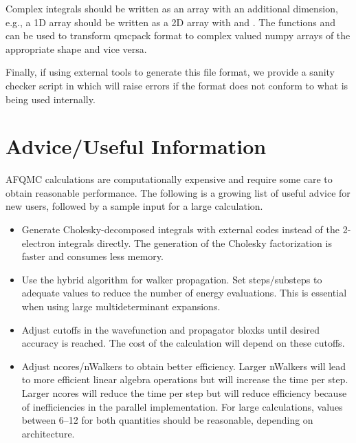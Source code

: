 Complex integrals should be written as an array with an additional dimension, e.g., a 1D array should be written as a 2D array with  and . The functions  and  can be used to transform qmcpack format to complex valued numpy arrays of the appropriate shape and vice versa.

Finally, if using external tools to generate this file format, we provide a sanity checker script in  which will raise errors if the format does not conform to what is being used internally.

\section{Advice/Useful Information}

AFQMC calculations are computationally expensive and require some care to obtain reasonable performance.
The following is a growing list of useful advice for new users, followed by a sample input for a large calculation.
\begin{itemize}
\item Generate Cholesky-decomposed integrals with external codes instead of the 2-electron integrals directly. The generation of the Cholesky factorization is faster and consumes less memory. 
\item Use the hybrid algorithm for walker propagation. Set steps/substeps to adequate values to reduce the number of energy evaluations. This is essential when using large multideterminant expansions.
\item Adjust cutoffs in the wavefunction and propagator bloxks until desired accuracy is reached. The cost of the calculation will depend on these cutoffs.
\item Adjust ncores/nWalkers to obtain better efficiency. Larger nWalkers will lead to more efficient linear algebra operations but will increase the time per step. Larger ncores will reduce the time per step but will reduce efficiency because of inefficiencies in the parallel implementation. For large calculations, values between 6--12 for both quantities should be reasonable, depending on architecture. 
\end{itemize}


